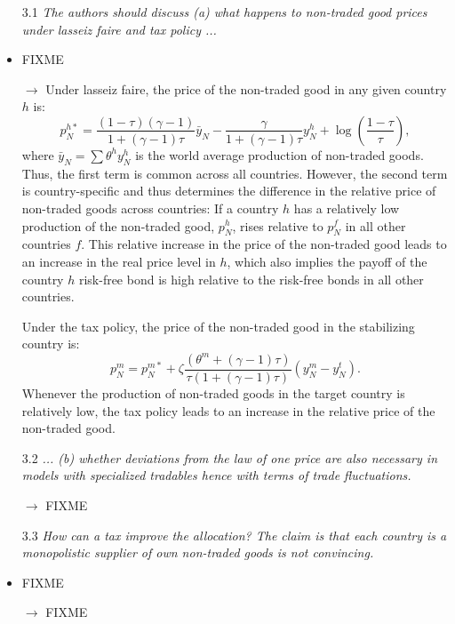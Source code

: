 \begin{itemize}
\item[3.1] \textit{The authors should discuss (a) what happens to
    non-traded good prices under lasseiz faire and tax policy ...}

\item FIXME

\item[$\rightarrow $] Under lasseiz faire, the price of the non-traded
  good in any given country $h$ is:
  \begin{equation*}
    p^{h \ast}_N
    = \frac{(1 - \tau)(\gamma - 1)}{1 + (\gamma - 1) \tau} \bar{y}_N
    - \frac{\gamma}{1 + (\gamma - 1) \tau} y^h_N
    + \log\left( \frac{1 - \tau}{\tau} \right),
  \end{equation*}
  where $\bar{y}_N = \sum \theta^h y^h_N$ is the world average
  production of non-traded goods. Thus, the first term is common
  across all countries. However, the second term is country-specific
  and thus determines the difference in the relative price of
  non-traded goods across countries: If a country $h$ has a relatively
  low production of the non-traded good, $p^h_N$, rises relative to
  $p^f_N$ in all other countries $f$. This relative increase in the
  price of the non-traded good leads to an increase in the real price
  level in $h$, which also implies the payoff of the country $h$
  risk-free bond is high relative to the risk-free bonds in all other
  countries.

  Under the tax policy, the price of the non-traded good in the
  stabilizing country is:
  \begin{equation*}
    p^m_N
    = p^{m \ast}_N
    + \zeta \frac{(\theta^m + (\gamma - 1) \tau)}{\tau (1 + (\gamma - 1) \tau)}
    \left( y^m_N - y^t_N \right).
  \end{equation*}
  Whenever the production of non-traded goods in the target country is
  relatively low, the tax policy leads to an increase in the relative
  price of the non-traded good.


\item[3.2] \textit{... (b) whether deviations from the law of one
    price are also necessary in models with specialized tradables
    hence with terms of trade fluctuations.}

\item[$\rightarrow $] FIXME

\item[3.3] \textit{How can a tax improve the allocation? The claim is
    that each country is a monopolistic supplier of own non-traded
    goods is not convincing.}

\item FIXME

\item[$\rightarrow $] FIXME

\end{itemize}

\newpage

 
